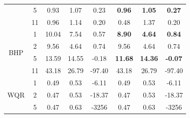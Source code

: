 \begin{table}[]
{\begin{tabular}{|c|c|ccc|ccc|}
                                  & 5                               & \multicolumn{1}{c|}{0.93}          & \multicolumn{1}{c|}{1.07}          & 0.23                  & \multicolumn{1}{c|}{\textbf{0.96}}  & \multicolumn{1}{c|}{\textbf{1.05}}  & \textbf{0.27}         \\ \cline{2-8} 
                                  & 11                              & \multicolumn{1}{c|}{0.96}          & \multicolumn{1}{c|}{1.14}          & 0.20                  & \multicolumn{1}{c|}{0.48}           & \multicolumn{1}{c|}{1.37}           & 0.20                  \\ \hline
\multirow{4}{*}{BHP}              & 1                               & \multicolumn{1}{c|}{10.04}         & \multicolumn{1}{c|}{7.54}          & 0.57                  & \multicolumn{1}{c|}{\textbf{8.90}}  & \multicolumn{1}{c|}{\textbf{4.64}}  & \textbf{0.84}         \\ \cline{2-8} 
                                  & 2                               & \multicolumn{1}{c|}{9.56}          & \multicolumn{1}{c|}{4.64}          & 0.74                  & \multicolumn{1}{c|}{9.56}           & \multicolumn{1}{c|}{4.64}           & 0.74                  \\ \cline{2-8} 
                                  & 5                               & \multicolumn{1}{c|}{13.59}         & \multicolumn{1}{c|}{14.55}         & -0.18                 & \multicolumn{1}{c|}{\textbf{11.68}} & \multicolumn{1}{c|}{\textbf{14.36}} & \textbf{-0.07}        \\ \cline{2-8} 
                                  & 11                              & \multicolumn{1}{c|}{43.18}         & \multicolumn{1}{c|}{26.79}         & -97.40                & \multicolumn{1}{c|}{43.18}          & \multicolumn{1}{c|}{26.79}          & -97.40                \\ \hline
\multirow{4}{*}{WQR}              & 1                               & \multicolumn{1}{c|}{0.49}          & \multicolumn{1}{c|}{0.53}          & -6.11                 & \multicolumn{1}{c|}{0.49}           & \multicolumn{1}{c|}{0.53}           & -6.11                 \\ \cline{2-8} 
                                  & 2                               & \multicolumn{1}{c|}{0.47}          & \multicolumn{1}{c|}{0.53}          & -18.37                & \multicolumn{1}{c|}{0.47}           & \multicolumn{1}{c|}{0.53}           & -18.37                \\ \cline{2-8} 
                                  & 5                               & \multicolumn{1}{c|}{0.47}          & \multicolumn{1}{c|}{0.63}          & -3256                 & \multicolumn{1}{c|}{0.47}           & \multicolumn{1}{c|}{0.63}           & -3256                 \\ \cline{2-8} 

\end{tabular}}
\end{table}
